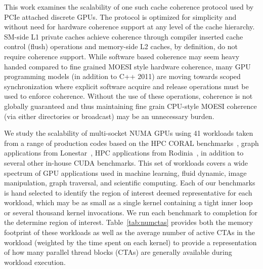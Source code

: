 This work examines the scalability of one such cache coherence 
protocol used by PCIe attached discrete GPUs. The protocol is optimized for simplicity
and without need for hardware coherence support at any level of the cache hierarchy.  
SM-side L1 private caches achieve coherence through 
compiler inserted cache control (flush) operations and memory-side L2 caches, 
by definition, do not require 
coherence support. While software based 
coherence may seem heavy handed compared to fine grained MOESI style hardware 
coherence, many GPU programming models (in addition to C++ 2011) are moving 
towards scoped synchronization where explicit software acquire and release 
operations must be used to enforce coherence.  Without the use of these 
operations, coherence is not globally guaranteed and thus maintaining fine 
grain CPU-style MOESI coherence (via either directories or broadcast) may be an 
unnecessary burden.

We study the scalability of multi-socket NUMA GPUs using 41 workloads 
taken from a range of 
production codes based on the HPC CORAL benchmarks~\cite{coral}, graph 
applications from Lonestar~\cite{lonestar}, HPC applications from 
Rodinia~\cite{Che2009}, in addition to several other in-house CUDA benchmarks. 
This set of workloads covers a wide spectrum of GPU applications used in 
machine learning, fluid dynamic, image manipulation, graph traversal, and
scientific computing.  Each of our benchmarks is hand selected to identify
the region of interest deemed representative for each workload, which may
be as small as a single kernel containing a tight inner loop or several thousand
kernel invocations.  We run each benchmark to completion for the determine
region of interest. Table~\ref{tab:numctas} provides both the memory footprint
of these workloads as well as the average number of active CTAs in the workload
(weighted by the time spent on each kernel) to provide a representation of 
how many parallel thread blocks (CTAs) are generally available
during workload execution.

